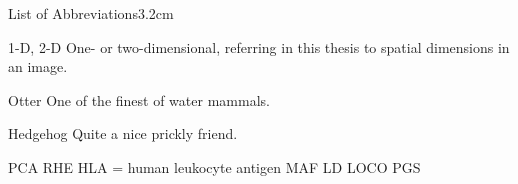 \begin{mclistof}{List of Abbreviations}{3.2cm}

\item[1-D, 2-D] One- or two-dimensional, referring in this thesis to spatial dimensions in an image.

\item[Otter] One of the finest of water mammals.

\item[Hedgehog] Quite a nice prickly friend.

PCA
RHE
HLA =  human leukocyte antigen
MAF
LD
LOCO
PGS

\end{mclistof} 
